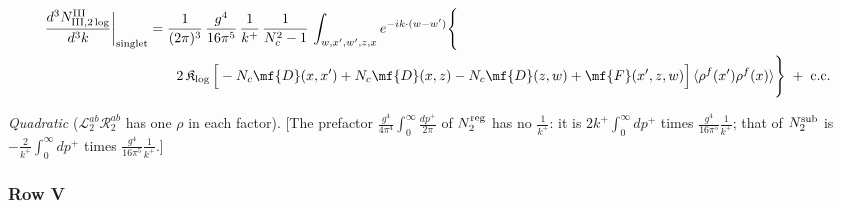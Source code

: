 {\begin{align}
\frac{d^{3}N^{\rm III}_{{\rm III},2\log}}{d^{3}k}\bigg|_{\rm singlet}&=\frac{1}{(2\pi)^{3}}\,\frac{g^{4}}{16\pi^{5}}\,\frac{1}{k^{+}}\,\frac{1}{N_{c}^{2}-1}\,\int_{w,x',w',z,x}e^{-ik\cdot(w-w')}\Bigg\{\notag\\
&\qquad 2\,\mathfrak{K}_{\log}\,\Big[-N_{c}\mf{D}(x,x')+N_{c}\mf{D}(x,z)-N_{c}\mf{D}(z,w)+\mf{F}(x',z,w)\Big]\,\langle\rho^{f}(x')\rho^{f}(x)\rangle\Bigg\}\;+\;{\rm c.c.}\label{eq:s-III-III-2log}
\end{align}

\emph{Quadratic} ($\mathcal{L}^{ab}_{2}\mathcal{R}^{ab}_{2}$ has one $\rho$ in each factor). [The prefactor $\frac{g^{4}}{4\pi^{4}}\int_{0}^{\infty}\frac{dp^{+}}{2\pi}$ of $N_{2}^{\rm reg}$ has no $\frac{1}{k^{+}}$: it is $2k^{+}\int_{0}^{\infty}dp^{+}$ times $\frac{g^{4}}{16\pi^{5}}\frac{1}{k^{+}}$; that of $N_{2}^{\rm sub}$ is $-\frac{2}{k^{+}}\int_{0}^{\infty}dp^{+}$ times $\frac{g^{4}}{16\pi^{5}}\frac{1}{k^{+}}$.]
\subsubsection*{Row V}

}
